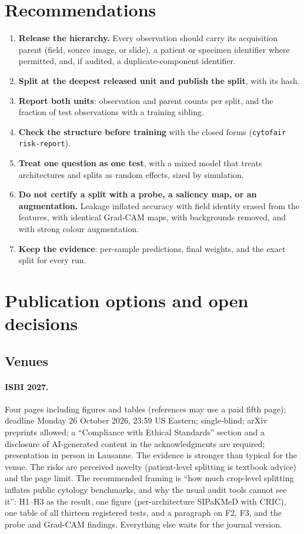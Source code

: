 \section{Recommendations}
\label{r:ch:recommendations}

\begin{enumerate}[leftmargin=1.8em]
\item \textbf{Release the hierarchy.} Every observation should carry its acquisition parent (field, source image, or slide),
a patient or specimen identifier where permitted, and, if audited, a duplicate-component identifier.
\item \textbf{Split at the deepest released unit and publish the split}, with its hash.
\item \textbf{Report both units}: observation and parent counts per split, and the fraction of test observations with a
training sibling.
\item \textbf{Check the structure before training} with the closed forms (\texttt{cytofair risk-report}).
\item \textbf{Treat one question as one test}, with a mixed model that treats architectures and splits as random effects,
sized by simulation.
\item \textbf{Do not certify a split with a probe, a saliency map, or an augmentation.} Leakage inflated accuracy with field
identity erased from the features, with identical Grad-CAM maps, with backgrounds removed, and with strong colour
augmentation.
\item \textbf{Keep the evidence}: per-sample predictions, final weights, and the exact split for every run.
\end{enumerate}

\section{Publication options and open decisions}
\label{r:ch:publication}

\subsection{Venues}
\label{r:sec:publication}

\paragraph{ISBI 2027.} Four pages including figures and tables (references may use a paid fifth page); deadline Monday 26
October 2026, 23:59 US Eastern; single-blind; arXiv preprints allowed; a ``Compliance with Ethical Standards'' section and a
disclosure of AI-generated content in the acknowledgments are required; presentation in person in Lausanne. The evidence is
stronger than typical for the venue. The risks are perceived novelty (patient-level splitting is textbook advice) and the
page limit. The recommended framing is ``how much crop-level splitting inflates public cytology benchmarks, and why the
usual audit tools cannot see it'': H1--H3 as the result, one figure (per-architecture SIPaKMeD with CRIC), one table of all
thirteen registered tests, and a paragraph on F2, F3, and the probe and Grad-CAM findings. Everything else waits for the
journal version.

